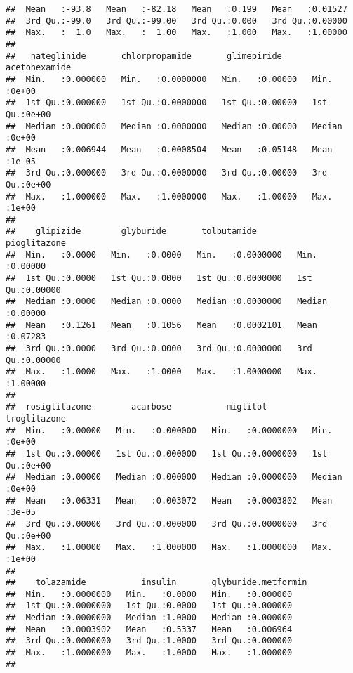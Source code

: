 \documentclass[11pt,]{article}
\begin{document}
\begin{verbatim}
##  Mean   :-93.8   Mean   :-82.18   Mean   :0.199   Mean   :0.01527  
##  3rd Qu.:-99.0   3rd Qu.:-99.00   3rd Qu.:0.000   3rd Qu.:0.00000  
##  Max.   :  1.0   Max.   :  1.00   Max.   :1.000   Max.   :1.00000  
##                                                                    
##   nateglinide       chlorpropamide       glimepiride      acetohexamide  
##  Min.   :0.000000   Min.   :0.0000000   Min.   :0.00000   Min.   :0e+00  
##  1st Qu.:0.000000   1st Qu.:0.0000000   1st Qu.:0.00000   1st Qu.:0e+00  
##  Median :0.000000   Median :0.0000000   Median :0.00000   Median :0e+00  
##  Mean   :0.006944   Mean   :0.0008504   Mean   :0.05148   Mean   :1e-05  
##  3rd Qu.:0.000000   3rd Qu.:0.0000000   3rd Qu.:0.00000   3rd Qu.:0e+00  
##  Max.   :1.000000   Max.   :1.0000000   Max.   :1.00000   Max.   :1e+00  
##                                                                          
##    glipizide        glyburide       tolbutamide         pioglitazone    
##  Min.   :0.0000   Min.   :0.0000   Min.   :0.0000000   Min.   :0.00000  
##  1st Qu.:0.0000   1st Qu.:0.0000   1st Qu.:0.0000000   1st Qu.:0.00000  
##  Median :0.0000   Median :0.0000   Median :0.0000000   Median :0.00000  
##  Mean   :0.1261   Mean   :0.1056   Mean   :0.0002101   Mean   :0.07283  
##  3rd Qu.:0.0000   3rd Qu.:0.0000   3rd Qu.:0.0000000   3rd Qu.:0.00000  
##  Max.   :1.0000   Max.   :1.0000   Max.   :1.0000000   Max.   :1.00000  
##                                                                         
##  rosiglitazone        acarbose           miglitol          troglitazone  
##  Min.   :0.00000   Min.   :0.000000   Min.   :0.0000000   Min.   :0e+00  
##  1st Qu.:0.00000   1st Qu.:0.000000   1st Qu.:0.0000000   1st Qu.:0e+00  
##  Median :0.00000   Median :0.000000   Median :0.0000000   Median :0e+00  
##  Mean   :0.06331   Mean   :0.003072   Mean   :0.0003802   Mean   :3e-05  
##  3rd Qu.:0.00000   3rd Qu.:0.000000   3rd Qu.:0.0000000   3rd Qu.:0e+00  
##  Max.   :1.00000   Max.   :1.000000   Max.   :1.0000000   Max.   :1e+00  
##                                                                          
##    tolazamide           insulin       glyburide.metformin
##  Min.   :0.0000000   Min.   :0.0000   Min.   :0.000000   
##  1st Qu.:0.0000000   1st Qu.:0.0000   1st Qu.:0.000000   
##  Median :0.0000000   Median :1.0000   Median :0.000000   
##  Mean   :0.0003902   Mean   :0.5337   Mean   :0.006964   
##  3rd Qu.:0.0000000   3rd Qu.:1.0000   3rd Qu.:0.000000   
##  Max.   :1.0000000   Max.   :1.0000   Max.   :1.000000   
##                                                          

\end{verbatim}
\end{document}
